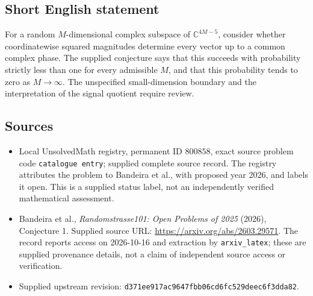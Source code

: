 \documentclass[11pt]{article}
\begin{document}
\subsection{Short English statement}
For a random \(M\)-dimensional complex subspace of \(\mathbb{C}^{4M-5}\), consider whether coordinatewise squared magnitudes determine every vector up to a common complex phase. The supplied conjecture says that this succeeds with probability strictly less than one for every admissible \(M\), and that this probability tends to zero as \(M\to\infty\). The unspecified small-dimension boundary and the interpretation of the signal quotient require review.
\subsection{Sources}
\begin{itemize}
\item Local UnsolvedMath registry, permanent ID \(800858\), exact source problem code \texttt{catalogue entry}; supplied complete source record. The registry attributes the problem to Bandeira et al., with proposed year 2026, and labels it open. This is a supplied status label, not an independently verified mathematical assessment.
\item Bandeira et al., \emph{Randomstrasse101: Open Problems of 2025} (2026), Conjecture 1. Supplied source URL: \url{https://arxiv.org/abs/2603.29571}. The record reports access on 2026-10-16 and extraction by \texttt{arxiv\_latex}; these are supplied provenance details, not a claim of independent source access or verification.
\item Supplied upstream revision: \texttt{d371ee917ac9647fbb06cd6fc529deec6f3dda82}.
\end{itemize}
\end{document}
